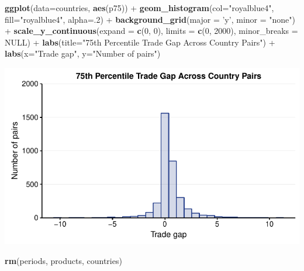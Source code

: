 \documentclass[10pt,]{article}
\newenvironment{Shaded}{\begin{snugshade}}{\end{snugshade}}
\newcommand{\KeywordTok}[1]{\textcolor[rgb]{0.13,0.29,0.53}{\textbf{{#1}}}}
\newcommand{\DataTypeTok}[1]{\textcolor[rgb]{0.13,0.29,0.53}{{#1}}}
\newcommand{\DecValTok}[1]{\textcolor[rgb]{0.00,0.00,0.81}{{#1}}}
\newcommand{\StringTok}[1]{\textcolor[rgb]{0.31,0.60,0.02}{{#1}}}
\newcommand{\OtherTok}[1]{\textcolor[rgb]{0.56,0.35,0.01}{{#1}}}
\newcommand{\NormalTok}[1]{{#1}}
\begin{document}
\begin{Shaded}
\begin{Highlighting}[]
\KeywordTok{ggplot}\NormalTok{(}\DataTypeTok{data=}\NormalTok{countries, }\KeywordTok{aes}\NormalTok{(p75)) +}
\StringTok{  }\KeywordTok{geom_histogram}\NormalTok{(}\DataTypeTok{col=}\StringTok{"royalblue4"}\NormalTok{,}
                 \DataTypeTok{fill=}\StringTok{"royalblue4"}\NormalTok{,}
                 \DataTypeTok{alpha=}\NormalTok{.}\DecValTok{2}\NormalTok{) +}
\StringTok{  }\KeywordTok{background_grid}\NormalTok{(}\DataTypeTok{major =} \StringTok{'y'}\NormalTok{, }\DataTypeTok{minor =} \StringTok{"none"}\NormalTok{) +}
\StringTok{  }\KeywordTok{scale_y_continuous}\NormalTok{(}\DataTypeTok{expand =} \KeywordTok{c}\NormalTok{(}\DecValTok{0}\NormalTok{, }\DecValTok{0}\NormalTok{), }\DataTypeTok{limits =} \KeywordTok{c}\NormalTok{(}\DecValTok{0}\NormalTok{, }\DecValTok{2000}\NormalTok{),  }\DataTypeTok{minor_breaks =} \OtherTok{NULL}\NormalTok{) +}
\StringTok{  }\KeywordTok{labs}\NormalTok{(}\DataTypeTok{title=}\StringTok{"75th Percentile Trade Gap Across Country Pairs"}\NormalTok{) +}
\StringTok{  }\KeywordTok{labs}\NormalTok{(}\DataTypeTok{x=}\StringTok{"Trade gap"}\NormalTok{, }\DataTypeTok{y=}\StringTok{"Number of pairs"}\NormalTok{)}
\end{Highlighting}
\end{Shaded}

\begin{center}\includegraphics{Figs/value_pairs-4} \end{center}

\begin{Shaded}
\begin{Highlighting}[]
\KeywordTok{rm}\NormalTok{(periods, products, countries)}
\end{Highlighting}
\end{Shaded}
\end{document}
